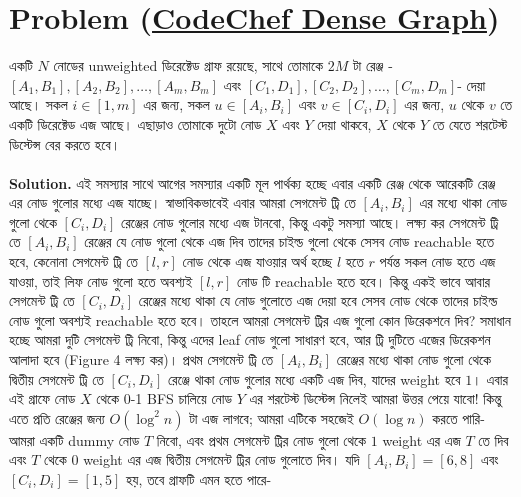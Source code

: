 \documentclass[11pt]{article}
\begin{document}
\section{Problem (\href{https://www.codechef.com/problems/DENSEGRP?tab=statementhttps://www.codechef.com/problems/DENSEGRP?tab=statement}{CodeChef Dense Graph})}
একটি $N$ নোডের unweighted ডিরেক্টেড গ্রাফ রয়েছে, সাথে তোমাকে $2M$ টা রেঞ্জ - $[A_1, B_1], [A_2, B_2], \dots , [A_m, B_m]$ এবং $[C_1, D_1], [C_2, D_2], \dots ,[C_m, D_m]$- দেয়া আছে। সকল $i \in [1, m]$ এর জন্য, সকল $u \in [A_i, B_i]$ এবং $v \in [C_i, D_i]$ এর জন্য, $u$ থেকে $v$ তে একটি ডিরেক্টেড এজ আছে। এছাড়াও তোমাকে দুটো নোড $X$ এবং $Y$ দেয়া থাকবে, $X$ থেকে $Y$ তে যেতে শরটেস্ট ডিস্টেন্স বের করতে হবে।
\\ \\
\textbf{Solution.} এই সমস্যার সাথে আগের সমস্যার একটি মূল পার্থক্য হচ্ছে এবার একটি রেঞ্জ থেকে আরেকটি রেঞ্জ এর নোড গুলোর মধ্যে এজ যাচ্ছে। স্বাভাবিকভাবেই এবার আমরা সেগমেন্ট ট্রি তে $[A_i, B_i]$ এর মধ্যে থাকা নোড গুলো থেকে $[C_i,D_i]$ রেঞ্জের নোড গুলোর মধ্যে এজ টানবো, কিন্তু একটু সমস্যা আছে। লক্ষ্য কর সেগমেন্ট ট্রি তে $[A_i,B_i]$ রেঞ্জের যে নোড গুলো থেকে এজ দিব তাদের চাইল্ড গুলো থেকে সেসব নোড reachable হতে হবে, কেনোনা সেগমেন্ট ট্রি তে $[l,r]$ নোড থেকে এজ যাওয়ার অর্থ হচ্ছে $l$ হতে $r$ পর্যন্ত সকল নোড হতে এজ যাওয়া, তাই লিফ নোড গুলো হতে অবশ্যই $[l,r]$ নোড টি reachable হতে হবে। কিন্তু একই ভাবে আবার সেগমেন্ট ট্রি তে $[C_i,D_i]$ রেঞ্জের মধ্যে থাকা যে নোড গুলোতে এজ দেয়া হবে সেসব নোড থেকে তাদের চাইল্ড নোড গুলো অবশ্যই reachable হতে হবে। তাহলে আমরা সেগমেন্ট ট্রির এজ গুলো কোন ডিরেকশনে দিব? সমাধান হচ্ছে আমরা দুটি সেগমেন্ট ট্রি নিবো, কিন্তু এদের leaf নোড গুলো সাধারণ হবে, আর ট্রি দুটিতে এজের ডিরেকশন আলাদা হবে (Figure 4 লক্ষ্য কর)। প্রথম সেগমেন্ট ট্রি তে $[A_i,B_i]$ রেঞ্জের মধ্যে থাকা নোড গুলো থেকে দ্বিতীয় সেগমেন্ট ট্রি তে $[C_i,D_i]$ রেঞ্জে থাকা নোড গুলোর মধ্যে একটি এজ দিব, যাদের weight হবে $1$। এবার এই গ্রাফে নোড $X$ থেকে 0-1 BFS চালিয়ে নোড $Y$ এর শরটেস্ট ডিস্টেন্স নিলেই আমরা উত্তর পেয়ে যাবো! কিন্তু এতে প্রতি রেঞ্জের জন্য $O(\log^2 n)$ টা এজ লাগবে; আমরা এটিকে সহজেই $O(\log n)$ করতে পারি- আমরা একটি dummy নোড $T$ নিবো, এবং প্রথম সেগমেন্ট ট্রির নোড গুলো থেকে $1$ weight এর এজ $T$ তে দিব এবং $T$ থেকে $0$ weight এর এজ দ্বিতীয় সেগমেন্ট ট্রির নোড গুলোতে দিব। যদি $[A_i,B_i]=[6,8]$ এবং $[C_i,D_i] = [1, 5]$ হয়, তবে গ্রাফটি এমন হতে পারে-
\end{document}
